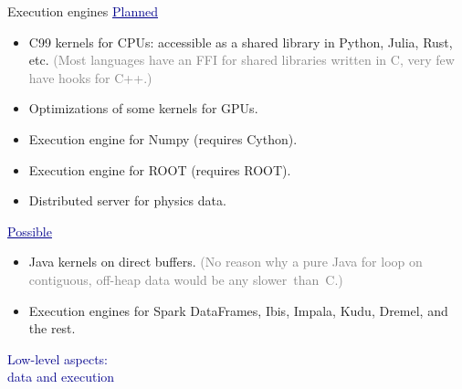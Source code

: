 \documentclass{beamer}
\begin{document}
\begin{frame}{Execution engines}
\vspace{0.5 cm}
\textcolor{darkblue}{\underline{Planned}}

\begin{itemize}
\item C99 kernels for CPUs: accessible as a shared library in Python, Julia, Rust, etc. \textcolor{gray}{(Most languages have an FFI for shared libraries written in C, very few have hooks for C++.)}
\item Optimizations of some kernels for GPUs.
\item Execution engine for Numpy (requires Cython).
\item Execution engine for ROOT (requires ROOT).
\item Distributed server for physics data.
\end{itemize}

\vspace{0.25 cm}
\textcolor{darkblue}{\underline{Possible}}

\begin{itemize}
\item Java kernels on direct buffers. \textcolor{gray}{(No reason why a pure Java for loop on contiguous, off-heap data would be any \mbox{slower than C.)\hspace{-1 cm}}}
\item Execution engines for Spark DataFrames, Ibis, Impala, Kudu, Dremel, and the rest.
\end{itemize}
\end{frame}

\begin{frame}{}
\begin{center}
\textcolor{darkblue}{\huge Low-level aspects: \\\vspace{0.25 cm} data and execution}
\end{center}
\end{frame}
\end{document}
